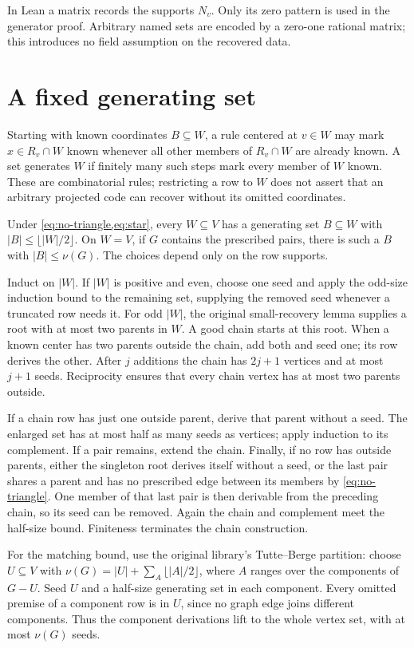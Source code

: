 In Lean a matrix records the supports $N_v$. Only its zero pattern is
used in the generator proof. Arbitrary named sets are encoded by a zero-one
rational matrix; this introduces no field assumption on the recovered data.

\section{A fixed generating set}\label{sec:generators}
Starting with known coordinates $B\subseteq W$, a rule centered at
$v\in W$ may mark $x\in R_v\cap W$ known whenever all other members of
$R_v\cap W$ are already known. A set generates $W$ if finitely many such
steps mark every member of $W$ known. These are combinatorial rules;
restricting a row to $W$ does not assert that an arbitrary projected code
can recover without its omitted coordinates.

\begin{theorem}
\label{thm:generators}
Under \cref{eq:no-triangle,eq:star}, every $W\subseteq V$ has a generating
set $B\subseteq W$ with $|B|\le\lfloor|W|/2\rfloor$. On $W=V$, if $G$
contains the prescribed pairs, there is such a $B$ with $|B|\le\nu(G)$.
The choices depend only on the row supports.
\end{theorem}
\begin{outline}
Induct on $|W|$. If $|W|$ is positive and even, choose one seed and apply
the odd-size induction bound to the remaining set, supplying the removed
seed whenever a truncated row needs it. For odd $|W|$, the original
small-recovery lemma supplies a root with at most two parents in $W$.
A good chain starts at this root. When a known center has two parents
outside the chain, add both and seed one; its row derives the other.
After $j$ additions the chain has $2j+1$ vertices and at most $j+1$ seeds.
Reciprocity ensures that every chain vertex has at most two parents outside.

If a chain row has just one outside parent, derive that parent without a
seed. The enlarged set has at most half as many seeds as vertices; apply
induction to its complement. If a pair remains, extend the chain. Finally,
if no row has outside parents, either the singleton root derives itself
without a seed, or the last pair shares a parent and has no prescribed
edge between its members by \cref{eq:no-triangle}. One member of that last
pair is then derivable from the preceding chain, so its seed can be removed.
Again the chain and complement meet the half-size bound. Finiteness
terminates the chain construction.

For the matching bound, use the original library's Tutte--Berge partition:
choose $U\subseteq V$ with
$\nu(G)=|U|+\sum_A\lfloor|A|/2\rfloor$, where $A$ ranges over the
components of $G-U$. Seed $U$ and a half-size generating set in each
component. Every omitted premise of a component row is in $U$, since no
graph edge joins different components. Thus the component derivations lift
to the whole vertex set, with at most $\nu(G)$ seeds.
\end{outline}

